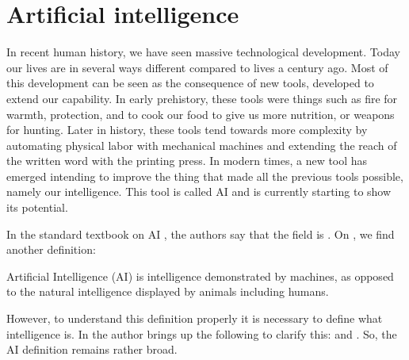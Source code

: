 \documentclass[12pt,A4]{report}
\newcommand{\autobaj}{}
\theoremstyle{definition}
\begin{document}

\section{Artificial intelligence}
In recent human history, we have seen massive technological development. Today our lives are in several ways different compared to lives a century ago. Most of this development can be seen as the consequence of new tools, developed to extend our capability. In early prehistory, these tools were things such as fire for warmth, protection, and to cook our food to give us more nutrition, or weapons for hunting. Later in history, these tools tend towards more complexity by automating physical labor with mechanical machines and extending the reach of the written word with the printing press. In modern times, a new tool has emerged intending to improve the thing that made all the previous tools possible, namely our intelligence. This tool is called AI and is currently starting to show its potential. 

In the standard textbook on AI \citet[p.19]{RusselNorvig}, the authors say that the field is . On \citet{Wiki}, we find another definition: 
\begin{displayquote}
Artificial Intelligence (AI) is intelligence demonstrated by machines, as opposed to the natural intelligence displayed by animals including humans.
\end{displayquote}
However, to understand this definition properly it is necessary to define what intelligence is. In \citet[\textbf{PAGE}]{TankandeMaskiner} the author brings up the following to clarify this:  and . So, the AI definition remains rather broad.
\end{document}
